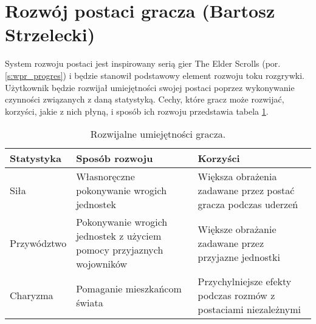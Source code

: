 \section{Rozwój postaci gracza (Bartosz Strzelecki)}\label{s:proj_progres}
System rozwoju postaci jest inspirowany serią gier The Elder Scrolls (por. \ref{s:wpr_progres}) i będzie stanowił podstawowy element rozwoju toku rozgrywki.
Użytkownik będzie rozwijał umiejętności swojej postaci poprzez wykonywanie czynności związanych z daną statystyką.
Cechy, które gracz może rozwijać, korzyści, jakie z nich płyną, i sposób ich rozwoju przedstawia tabela \ref{fig:prog}.

\begin{table}[h]
\caption{Rozwijalne umiejętności gracza.}
\begin{center}
  \begin{tabular}{ | m{10em} | m{10em} | m{10em} | }
  \hline
    Statystyka & Sposób rozwoju & Korzyści \\
  \hline\hline
    Siła & Własnoręczne pokonywanie wrogich jednostek & Większa obrażenia zadawane przez postać gracza podczas uderzeń \\
    Przywództwo & Pokonywanie wrogich jednostek z użyciem pomocy przyjaznych wojowników & Większe obrażanie zadawane przez przyjazne jednostki \\
    Charyzma & Pomaganie mieszkańcom świata & Przychylniejsze efekty podczas rozmów z postaciami niezależnymi \\
  \hline
  \end{tabular}
\end{center}
\label{fig:prog}
\end{table}
